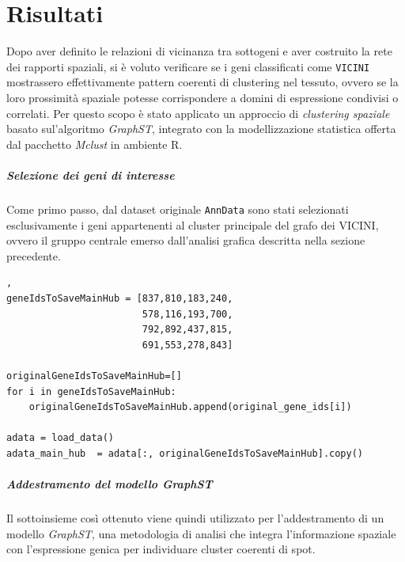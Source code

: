 \chapter{Risultati}\label{chapter:risultati}
Dopo aver definito le relazioni di vicinanza tra sottogeni 
e aver costruito la rete dei rapporti spaziali, si è voluto verificare se i geni classificati 
come \texttt{VICINI} mostrassero effettivamente pattern coerenti di clustering nel
tessuto, ovvero se la loro prossimità spaziale potesse corrispondere 
a domini di espressione condivisi o correlati. Per questo scopo è stato applicato 
un approccio di \textit{clustering spaziale} basato sul'algoritmo \textit{GraphST},
integrato con la modellizzazione statistica offerta dal pacchetto \textit{Mclust} in ambiente R.


\paragraph{Selezione dei geni di interesse\\}
Come primo passo, dal dataset originale \texttt{AnnData} 
sono stati selezionati esclusivamente i geni appartenenti al cluster 
principale del grafo dei VICINI, ovvero il gruppo centrale emerso dall'analisi 
grafica descritta nella sezione precedente.  

\begin{lstlisting}[style=mypython,
                   label=code:NN,
                   caption={Creazione anndata con solo geni del cluster principale dei VICINI},
                   basicstyle=\ttfamily\scriptsize],
geneIdsToSaveMainHub = [837,810,183,240,
						578,116,193,700,
						792,892,437,815,
						691,553,278,843]

originalGeneIdsToSaveMainHub=[]
for i in geneIdsToSaveMainHub:
    originalGeneIdsToSaveMainHub.append(original_gene_ids[i])

adata = load_data()
adata_main_hub  = adata[:, originalGeneIdsToSaveMainHub].copy()
\end{lstlisting}

\paragraph{Addestramento del modello GraphST\\}
Il sottoinsieme così ottenuto viene quindi utilizzato per l'addestramento 
di un modello \textit{GraphST}, una metodologia di analisi 
che integra l'informazione spaziale con l'espressione genica per 
individuare cluster coerenti di spot.

